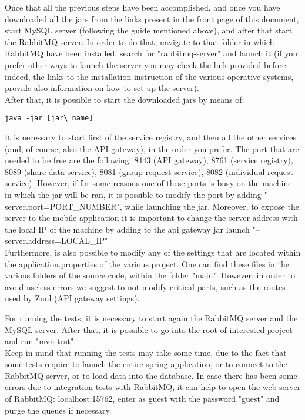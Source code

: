 Once that all the previous steps have been accomplished, and once you have downloaded all the jars from the links present in the front page
of this document, start MySQL server (following the guide mentioned above), and after that start the RabbitMQ server. In order to do that, 
navigate to that folder in which RabbitMQ have been installed, search for "rabbitmq-server" and launch it (if you prefer other ways to launch
the server you may check the link provided before: indeed, the links to the installation instruction of the various operative systems,
provide also information on how to set up the server). \\
After that, it is possible to start the downloaded jars by means of: 
\begin{verbatim}
java -jar [jar\_name]
\end{verbatim}
It is necessary to start first of the service registry, and then all the other services (and, of course, also the API gateway), in the
order you prefer. 
The port that are needed to be free are the following: 8443 (API gateway), 8761 (service registry), 8089 (share data service), 8081 (group
request service), 8082 (individual request service). However, if for some reasons one of these ports is busy on the
machine in which the jar will be ran, it is possible to modify the port by adding "--server.port=PORT\_NUMBER", while launching the jar. Moreover, to expose the server to the mobile application it is important to change the server address with the local IP of the machine by adding to the api gateway jar launch "--server.address=LOCAL\_IP" \\
Furthermore, is also possible to modify any of the settings that are located within the application.properties of the various project.
One can find these files in the various folders of the source code, within the folder "main". However, in order to avoid useless errors
we suggest to not modify critical parts, such as the routes used by Zuul (API gateway settings). \\

\par 
For running the tests, it is necessary to start again the RabbitMQ server and the MySQL server. After that, it is possible to go into
the root of interested project and run "mvn test". \\
Keep in mind that running the tests may take some time, due to the fact that some tests require to launch the entire spring application,
or to connect to the RabbitMQ server, or to load data into the database. In case there has been some errors due to integration 
tests with RabbitMQ, it can help to open the web server of RabbitMQ: localhost:15762, enter as guest with the password "guest" 
and purge the queues if necessary.

